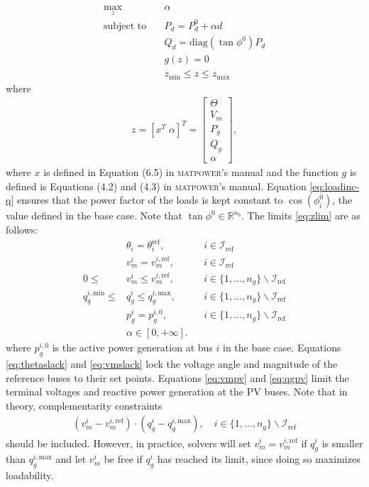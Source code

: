 \documentclass[12pt,a4]{article}
\newcommand*{\field}[1]{\mathbb{#1}}
\newcommand*{\R}{\field{R}} %
\newcommand*{\matpower}{\textsc{matpower}}
\begin{document}
\begin{subequations}\label{eq:maxll}
\begin{align}
  \max_{z} \quad & \alpha \label{eq:maxll-obj} \\
  \text{subject to} \quad & P_d = P_d^0 + \alpha d \label{eq:loadinc}\\
   & Q_d = \text{diag}(\tan \phi^0) P_d \label{eq:loadinc-q}\\
   & g(z) = 0 \\
   & z_\text{min} \leq z \leq z_\text{max} \label{eq:zlim}
\end{align}  
\end{subequations}
where
\begin{align}
  \label{eq:z}
  z = [x^T \; \alpha]^T =  \begin{bmatrix}
    \Theta \\
    V_m \\
    P_g \\
    Q_g \\
    \alpha
  \end{bmatrix},
\end{align}
where $x$ is defined in Equation (6.5) in \matpower's manual and the function $g$ is defined is Equations (4.2) and (4.3) in \matpower's manual.
Equation \eqref{eq:loadinc-q} ensures that the power factor of the loads is kept constant to $\cos(\phi_i^0)$, the value defined in the base case.
Note that $\tan \phi^0 \in \R^{n_b}$.
The limits \eqref{eq:zlim} are as follows:
\begin{align}
  & \theta_i = \theta_i^\text{ref}, && i \in \mathcal{I}_\text{ref} \label{eq:thetaslack} \\
  & v_m^{i} = v_m^{i,\text{ref}}, && i \in \mathcal{I}_\text{ref} \label{eq:vmslack} \\
  0 \leq & v_m^{i} \leq v_m^{i,\text{ref}}, && i \in \{1,\ldots,n_g\} \backslash \mathcal{I}_\text{ref} \label{eq:vmpv} \\
  q_q^{i,\text{min}} \leq & q_g^i \leq q_g^{i,\text{max}}, && i \in \{1,\ldots,n_g\} \backslash \mathcal{I}_\text{ref} \label{eq:qgpv}\\
  & p_g^i = p_g^{i,0}, && i \in \{1,\ldots,n_g\} \backslash \mathcal{I}_\text{ref} \\
  & \alpha \in [0,+\infty].
\end{align}
where $p_g^{i,0}$ is the active power generation at bus $i$ in the base case.
Equations \eqref{eq:thetaslack} and \eqref{eq:vmslack} lock the voltage angle and magnitude of the reference buses to their set points.
Equations \eqref{eq:vmpv} and \eqref{eq:qgpv} limit the terminal voltages and reactive power generation at the PV buses. 
Note that in theory, complementarity constraints
\begin{align}
  \label{eq:comp-constr}
  (v_m^i-v_m^{i,\text{ref}})\cdot(q_g^i-q_g^{i,\text{max}}), \quad i \in \{1,\ldots,n_g\} \backslash \mathcal{I}_\text{ref}
\end{align}
should be included. 
However, in practice, solvers will set $v_m^i = v_m^{i,\text{ref}}$ if $q_g^i$ is smaller than $q_g^{i,\text{max}}$ and let $v_m^i$ be free if $q_g^i$ has reached its limit, since doing so maximizes loadability.
\end{document}
